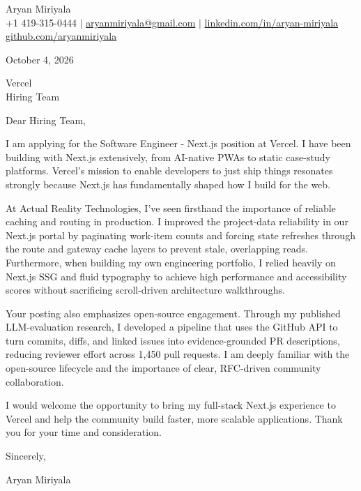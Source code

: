 \documentclass[letterpaper,11pt]{article}
\begin{document}
Aryan Miriyala\\
+1 419-315-0444 $|$ \href{mailto:aryanmiriyala@gmail.com}{aryanmiriyala@gmail.com} $|$ \href{https://www.linkedin.com/in/aryan-miriyala-7788a21b6/}{linkedin.com/in/aryan-miriyala}\\
\href{https://github.com/aryanmiriyala}{github.com/aryanmiriyala}

October 4, 2026

Vercel\\
Hiring Team

Dear Hiring Team,

I am applying for the Software Engineer - Next.js position at Vercel. I have been building with Next.js extensively, from AI-native PWAs to static case-study platforms. Vercel's mission to enable developers to just ship things resonates strongly because Next.js has fundamentally shaped how I build for the web.

At Actual Reality Technologies, I’ve seen firsthand the importance of reliable caching and routing in production. I improved the project-data reliability in our Next.js portal by paginating work-item counts and forcing state refreshes through the route and gateway cache layers to prevent stale, overlapping reads. Furthermore, when building my own engineering portfolio, I relied heavily on Next.js SSG and fluid typography to achieve high performance and accessibility scores without sacrificing scroll-driven architecture walkthroughs.

Your posting also emphasizes open-source engagement. Through my published LLM-evaluation research, I developed a pipeline that uses the GitHub API to turn commits, diffs, and linked issues into evidence-grounded PR descriptions, reducing reviewer effort across 1,450 pull requests. I am deeply familiar with the open-source lifecycle and the importance of clear, RFC-driven community collaboration.

I would welcome the opportunity to bring my full-stack Next.js experience to Vercel and help the community build faster, more scalable applications. Thank you for your time and consideration.

Sincerely,

Aryan Miriyala
\end{document}
